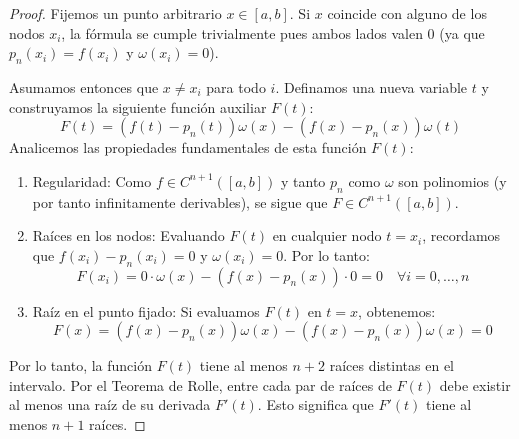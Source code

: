 \begin{proof}
    Fijemos un punto arbitrario $x \in [a,b]$. Si $x$ coincide con alguno de los nodos $x_i$, la fórmula se cumple trivialmente pues ambos lados valen 0 (ya que $p_n(x_i) = f(x_i)$ y $\omega(x_i) = 0$).

    Asumamos entonces que $x \neq x_i$ para todo $i$. Definamos una nueva variable $t$ y construyamos la siguiente función auxiliar $F(t)$:
    \[
        F(t) = \left( f(t) - p_n(t) \right) \omega(x) - \left( f(x) - p_n(x) \right) \omega(t)
    \]
    Analicemos las propiedades fundamentales de esta función $F(t)$:
    \begin{enumerate}
        \item Regularidad: Como $f \in C^{n+1}([a,b])$ y tanto $p_n$ como $\omega$ son polinomios (y por tanto infinitamente derivables), se sigue que $F \in C^{n+1}([a,b])$.
        \item Raíces en los nodos: Evaluando $F(t)$ en cualquier nodo $t = x_i$, recordamos que $f(x_i) - p_n(x_i) = 0$ y $\omega(x_i) = 0$. Por lo tanto:
        \[
            F(x_i) = 0 \cdot \omega(x) - (f(x) - p_n(x)) \cdot 0 = 0 \quad \forall i = 0, \dots, n
        \]
        \item Raíz en el punto fijado: Si evaluamos $F(t)$ en $t = x$, obtenemos:
        \[
            F(x) = \left( f(x) - p_n(x) \right) \omega(x) - \left( f(x) - p_n(x) \right) \omega(x) = 0
        \]
    \end{enumerate}
    
    Por lo tanto, la función $F(t)$ tiene al menos $n+2$ raíces distintas en el intervalo. Por el Teorema de Rolle, entre cada par de raíces de $F(t)$ debe existir al menos una raíz de su derivada $F'(t)$. Esto significa que $F'(t)$ tiene al menos $n+1$ raíces.
    

\end{proof}
